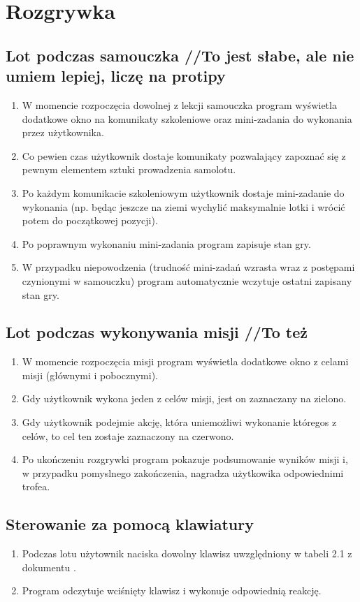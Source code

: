 \documentclass{mwrep}
\begin{document}
\chapter{Rozgrywka}
\section{Lot podczas samouczka //To jest słabe, ale nie umiem lepiej, liczę na protipy}
\begin{enumerate}
  \item W momencie rozpoczęcia dowolnej z lekcji samouczka program wyświetla dodatkowe okno na komunikaty szkoleniowe oraz mini-zadania do wykonania przez użytkownika.
  \item Co pewien czas użytkownik dostaje komunikaty pozwalający zapoznać się z pewnym elementem sztuki prowadzenia samolotu.
  \item Po każdym komunikacie szkoleniowym użytkownik dostaje mini-zadanie do wykonania (np. będąc jeszcze na ziemi wychylić maksymalnie lotki i wrócić potem do początkowej pozycji).
  \item Po poprawnym wykonaniu mini-zadania program zapisuje stan gry.
  \item W przypadku niepowodzenia (trudność mini-zadań wzrasta wraz z postępami czynionymi w samouczku) program automatycznie wczytuje ostatni zapisany stan gry.
\end{enumerate}

\section{Lot podczas wykonywania misji //To też}
\begin{enumerate}
  \item W momencie rozpoczęcia misji program wyświetla dodatkowe okno z celami misji (głównymi i pobocznymi).
  \item Gdy użytkownik wykona jeden z celów misji, jest on zaznaczany na zielono.
  \item Gdy użytkownik podejmie akcję, która uniemożliwi wykonanie któregos z celów, to cel ten zostaje zaznaczony na czerwono.
  \item Po ukończeniu rozgrywki program pokazuje podsumowanie wyników misji i, w przypadku pomyslnego zakończenia, nagradza użytkowika odpowiednimi trofea.
\end{enumerate}

\section{Sterowanie za pomocą klawiatury}
\begin{enumerate}
  \item Podczas lotu użytownik naciska dowolny klawisz uwzględniony w tabeli 2.1 z dokumentu \cite{WYM}.
  \item Program odczytuje wciśnięty klawisz i wykonuje odpowiednią reakcję.
\end{enumerate}
\end{document}
